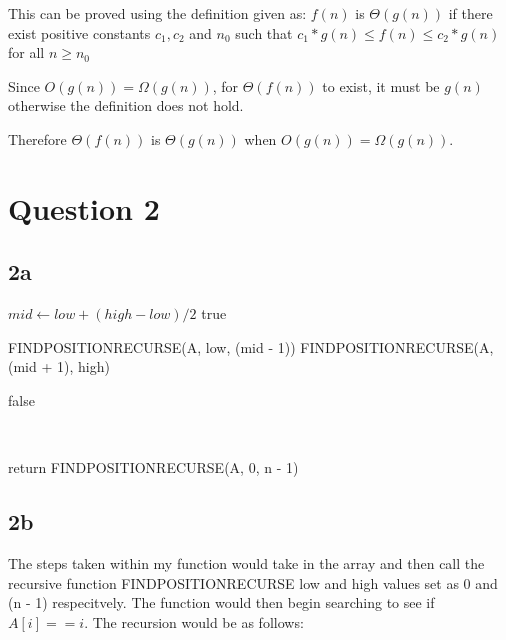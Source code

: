 \documentclass[oneside, a4paper]{article}
\begin{document}
This can be proved using the definition given as:
$f(n)$ is $\Theta(g(n))$ if there exist positive constants $c_1, c_2$ and $n_0$ such that $c_1 * g(n) \leq f(n) \leq c_2 * g(n)$ for all $n \geq n_0$

Since $O(g(n)) = \Omega(g(n))$, for $\Theta(f(n))$ to exist, it must be $g(n)$ otherwise the definition does not hold. 

Therefore $\Theta(f(n))$ is $\Theta(g(n))$ when $O(g(n)) = \Omega(g(n))$.

\newpage

\setcounter{secnumdepth}{-1}
\section{Question 2}

\subsection*{2a}
\begin{algorithmic}
            \State $mid \gets low + (high - low) / 2$
                \State \Return true    
            \EndIf
                
                \State \Return FINDPOSITIONRECURSE(A, low, (mid - 1))
            \Else
                \State \Return FINDPOSITIONRECURSE(A, (mid + 1), high)
            \EndIf

        \Else 
            \State \Return false    
        \EndIf
        
    \EndFunction
\end{algorithmic}
\
\
\begin{algorithmic}
        \State return FINDPOSITIONRECURSE(A, 0, n - 1)
    \EndFunction
\end{algorithmic}


\subsection*{2b}
The steps taken within my function would take in the array and then call the recursive function FINDPOSITIONRECURSE low and high values set as 0 and (n - 1) respecitvely. The function would then begin searching to see if $A[i] == i$. The recursion would be as follows:
\end{document}
